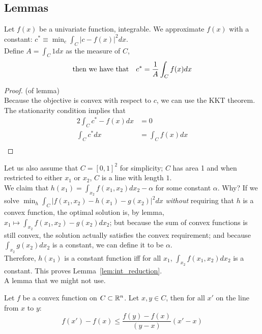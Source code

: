 \documentclass{article}
\begin{document}
	
\subsection{Lemmas}
\begin{lemma}
Let $f(x)$ be a univariate function, integrable. We approximate $f(x)$ with a constant: $c^* \equiv \min_c \int_C | c - f(x) |^2 dx$.\\
Define $A = \int_C 1 dx$ as the measure of $C$, 
\[
\textrm{then we have that} \quad c^* = \frac{1}{A} \int_C f(x) dx
\]
\end{lemma}
\begin{proof} (of lemma)\\

Because the objective is convex with respect to $c$, we can use the KKT theorem. The stationarity condition implies that
\begin{align*}
2 \int_C c^* - f(x) dx &= 0 \\
\int_C c^* dx &= \int_C f(x) dx \\
\end{align*}
\end{proof}

Let us also assume that $C = [0, 1]^2$ for simplicity; $C$ has area 1 and when restricted to either $x_1$ or $x_2$, $C$ is a line with length $1$. \\

We claim that $h(x_1) = \int_ {x_2} f(x_1,x_2) d x_2 - \alpha$ for some constant $\alpha$. Why? If we solve $ \min_h \int_C | f (x_1, x_2) - h(x_1) - g(x_2) |^2 dx$ \emph{without} requiring that $h$ is a convex function, the optimal solution is, by lemma, $ x_1 \mapsto \int_ {x_2} f(x_1,x_2) - g(x_2) d x_2$; but because the sum of convex functions is still convex, the solution actually satisfies the convex requirement; and because $\int_{x_2} g(x_2) d x_2$ is a constant, we can define it to be $\alpha$.\\

Therefore, $h(x_1)$ is a constant function iff for all $x_1$, $\int_{x_2} f(x_1,x_2) dx_2$ is a constant. This proves Lemma~\ref{lem:int_reduction}.\\



A lemma that we might not use.
\begin{lemma}
Let $f$ be a convex function on $C \subset \mathbb{R}^n$. Let $x, y \in C$, then for all $x'$ on the line from $x$ to $y$:
\[
f(x') - f(x) \leq \frac{f(y) - f(x)}{(y-x)} (x' - x)
\]
\end{lemma}
\end{document}
